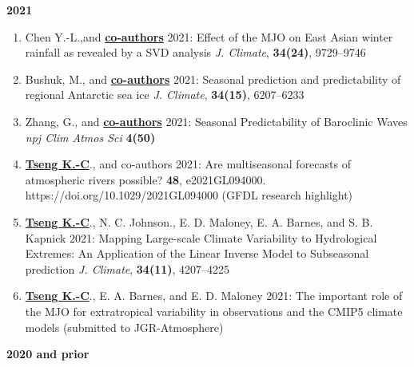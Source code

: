 \documentclass{article}
\begin{document}
\normalsize{\bf{2021}} 
\begin{enumerate}[resume]   
	\item Chen Y.-L.,and \normalsize{\bf{\underline{co-authors}}} 2021: Effect of the MJO on East Asian winter rainfall as revealed by a SVD analysis \textit{J. Climate}, \normalsize{\bf{34(24)}}, 9729--9746 \par
	\item Bushuk, M., and \normalsize{\bf{\underline{co-authors}}} 2021: Seasonal prediction and predictability of regional Antarctic sea ice \textit{J. Climate}, \normalsize{\bf{34(15)}}, 6207--6233 \par
	\item Zhang, G., and \normalsize{\bf{\underline{co-authors}}} 2021: Seasonal Predictability of Baroclinic Waves \textit{npj Clim Atmos Sci} \normalsize{\bf{4(50)}}  \par
    \item \normalsize{\bf{\underline{Tseng K.-C}}}., and co-authors 2021: Are multiseasonal forecasts of atmospheric rivers possible? \normalsize{\bf{48}}, e2021GL094000. https://doi.org/10.1029/2021GL094000 (GFDL research highlight)\par
	\item \normalsize{\bf{\underline{Tseng K.-C}}}., N. C. Johnson., E. D. Maloney, E. A. Barnes, and S. B. Kapnick 2021: Mapping Large-scale Climate Variability to Hydrological Extremes: An Application of the Linear Inverse Model to Subseasonal prediction \textit{J. Climate}, \normalsize{\bf{34(11)}}, 4207--4225 \par
	\item \normalsize{\bf{\underline{Tseng K.-C}}}., E. A. Barnes, and E. D. Maloney 2021: The important role of the MJO for extratropical variability in observations and the CMIP5 climate models (submitted to JGR-Atmosphere)  \par 
	 \end{enumerate}
\normalsize{\bf{2020} and prior} 
\end{document}

